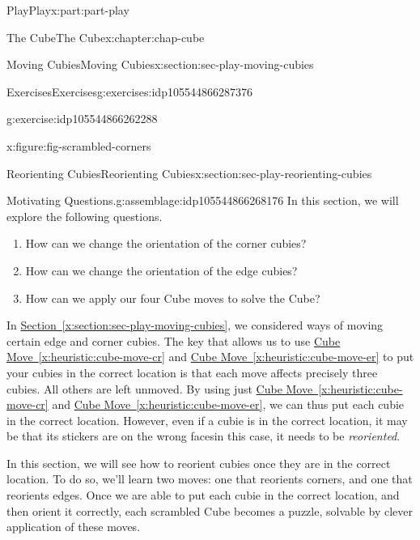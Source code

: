 \documentclass[oneside,10pt,]{book}
\newcommand{\xreffont}{\relax}
\numberwithin{equation}{section}
\begin{document}
\begin{partptx}{Play}{}{Play}{}{}{x:part:part-play}
\begin{chapterptx}{The Cube}{}{The Cube}{}{}{x:chapter:chap-cube}
\begin{sectionptx}{Moving Cubies}{}{Moving Cubies}{}{}{x:section:sec-play-moving-cubies}
\begin{exercises-subsection-numberless}{Exercises}{}{Exercises}{}{}{g:exercises:idp105544866287376}
\begin{divisionexercise}{4}{}{}{g:exercise:idp105544866262288}
\begin{figureptx}{}{x:figure:fig-scrambled-corners}{}
\begin{image}{0.25}{0.5}{0.25}
\end{image}%
\tcblower
\end{figureptx}%
\end{divisionexercise}%
\end{exercises-subsection-numberless}
\end{sectionptx}
%
%
\typeout{************************************************}
\typeout{************************************************}
%
\begin{sectionptx}{Reorienting Cubies}{}{Reorienting Cubies}{}{}{x:section:sec-play-reorienting-cubies}
\begin{assemblage}{Motivating Questions.}{g:assemblage:idp105544866268176}%
In this section, we will explore the following questions. %
\begin{enumerate}
\item{}How can we change the orientation of the corner cubies?%
\item{}How can we change the orientation of the edge cubies?%
\item{}How can we apply our four Cube moves to solve the Cube?%
\end{enumerate}
%
\end{assemblage}
\begin{introduction}{}%
In \hyperref[x:section:sec-play-moving-cubies]{Section~{\xreffont\ref{x:section:sec-play-moving-cubies}}}, we considered ways of moving certain edge and corner cubies. The key that allows us to use \hyperref[x:heuristic:cube-move-cr]{Cube Move~{\xreffont\ref{x:heuristic:cube-move-cr}}} and \hyperref[x:heuristic:cube-move-er]{Cube Move~{\xreffont\ref{x:heuristic:cube-move-er}}} to put your cubies in the correct location is that each move affects precisely three cubies. All others are left unmoved. By using just \hyperref[x:heuristic:cube-move-cr]{Cube Move~{\xreffont\ref{x:heuristic:cube-move-cr}}} and \hyperref[x:heuristic:cube-move-er]{Cube Move~{\xreffont\ref{x:heuristic:cube-move-er}}}, we can thus put each cubie in the correct location. However, even if a cubie is in the correct location, it may be that its stickers are on the wrong faces\textemdash{}in this case, it needs to be \emph{reoriented}.%
\par
In this section, we will see how to reorient cubies once they are in the correct location. To do so, we'll learn two moves: one that reorients corners, and one that reorients edges. Once we are able to put each cubie in the correct location, and then orient it correctly, each scrambled Cube becomes a puzzle, solvable by clever application of these moves.%

\end{introduction}
\end{sectionptx}
\end{chapterptx}
\end{partptx}
\end{document}
